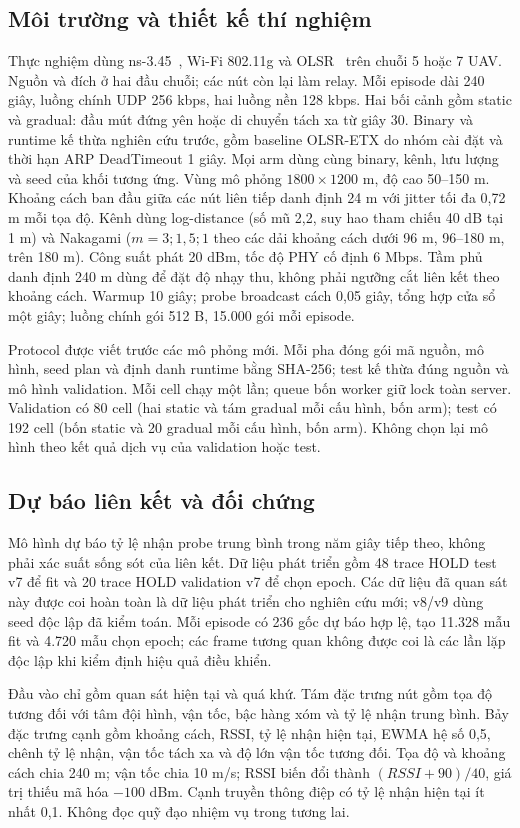 \subsection{Môi trường và thiết kế thí nghiệm}
Thực nghiệm dùng ns-3.45~\cite{ns3}, Wi-Fi 802.11g và OLSR~\cite{rfc3626} trên chuỗi 5 hoặc 7 UAV.
Nguồn và đích ở hai đầu chuỗi; các nút còn lại làm relay. Mỗi episode dài
240 giây, luồng chính UDP 256 kbps, hai luồng nền 128 kbps. Hai bối cảnh gồm
static và gradual: đầu mút đứng yên hoặc di chuyển tách xa từ giây 30.
Binary và runtime kế thừa nghiên cứu trước, gồm baseline OLSR-ETX do nhóm
cài đặt và thời hạn ARP DeadTimeout 1 giây. Mọi arm dùng cùng binary,
kênh, lưu lượng và seed của khối tương ứng.
Vùng mô phỏng $1800\times1200$ m, độ cao 50--150 m. Khoảng cách ban đầu
giữa các nút liên tiếp danh định 24 m với jitter tối đa 0,72 m mỗi tọa độ.
Kênh dùng log-distance (số mũ 2,2, suy hao tham chiếu 40 dB tại 1 m) và
Nakagami ($m=3;1{,}5;1$ theo các dải khoảng cách dưới 96 m, 96--180 m,
trên 180 m). Công suất phát 20 dBm, tốc độ PHY cố định 6 Mbps. Tầm phủ
danh định 240 m dùng để đặt độ nhạy thu, không phải ngưỡng cắt liên kết
theo khoảng cách. Warmup 10 giây; probe broadcast cách 0,05 giây, tổng hợp
cửa sổ một giây; luồng chính gói 512 B, 15.000 gói mỗi episode.

Protocol được viết trước các mô phỏng mới. Mỗi pha đóng gói mã nguồn, mô
hình, seed plan và định danh runtime bằng SHA-256; test kế thừa đúng nguồn
và mô hình validation. Mỗi cell chạy một lần; queue bốn worker giữ lock
toàn server. Validation có 80 cell (hai static và tám gradual mỗi cấu hình,
bốn arm); test có 192 cell (bốn static và 20 gradual mỗi cấu hình, bốn arm).
Không chọn lại mô hình theo kết quả dịch vụ của validation hoặc test.

\subsection{Dự báo liên kết và đối chứng}
Mô hình dự báo tỷ lệ nhận probe trung bình trong năm giây tiếp theo, không
phải xác suất sống sót của liên kết. Dữ liệu phát triển gồm 48 trace HOLD
test v7 để fit và 20 trace HOLD validation v7 để chọn epoch. Các dữ liệu đã
quan sát này được coi hoàn toàn là dữ liệu phát triển cho nghiên cứu mới;
v8/v9 dùng seed độc lập đã kiểm toán. Mỗi episode có 236 gốc dự báo hợp lệ,
tạo 11.328 mẫu fit và 4.720 mẫu chọn epoch; các frame tương quan không được
coi là các lần lặp độc lập khi kiểm định hiệu quả điều khiển.

Đầu vào chỉ gồm quan sát hiện tại và quá khứ. Tám đặc trưng nút gồm tọa độ
tương đối với tâm đội hình, vận tốc, bậc hàng xóm và tỷ lệ nhận trung bình.
Bảy đặc trưng cạnh gồm khoảng cách, RSSI, tỷ lệ nhận hiện tại, EWMA hệ số
0,5, chênh tỷ lệ nhận, vận tốc tách xa và độ lớn vận tốc tương đối. Tọa độ
và khoảng cách chia 240 m; vận tốc chia 10 m/s; RSSI biến đổi thành
$(RSSI+90)/40$, giá trị thiếu mã hóa $-100$ dBm. Cạnh truyền thông điệp có
tỷ lệ nhận hiện tại ít nhất 0,1. Không đọc quỹ đạo nhiệm vụ trong tương lai.

